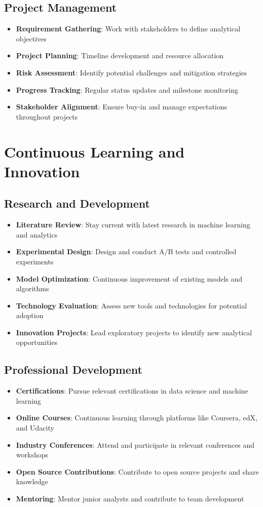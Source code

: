 \documentclass[11pt,a4paper]{article}
\begin{document}
\subsection{Project Management}
\begin{itemize}[leftmargin=*]
    \item \textbf{Requirement Gathering}: Work with stakeholders to define analytical objectives
    \item \textbf{Project Planning}: Timeline development and resource allocation
    \item \textbf{Risk Assessment}: Identify potential challenges and mitigation strategies
    \item \textbf{Progress Tracking}: Regular status updates and milestone monitoring
    \item \textbf{Stakeholder Alignment}: Ensure buy-in and manage expectations throughout projects
\end{itemize}

\section{Continuous Learning and Innovation}

\subsection{Research and Development}
\begin{itemize}[leftmargin=*]
    \item \textbf{Literature Review}: Stay current with latest research in machine learning and analytics
    \item \textbf{Experimental Design}: Design and conduct A/B tests and controlled experiments
    \item \textbf{Model Optimization}: Continuous improvement of existing models and algorithms
    \item \textbf{Technology Evaluation}: Assess new tools and technologies for potential adoption
    \item \textbf{Innovation Projects}: Lead exploratory projects to identify new analytical opportunities
\end{itemize}

\subsection{Professional Development}
\begin{itemize}[leftmargin=*]
    \item \textbf{Certifications}: Pursue relevant certifications in data science and machine learning
    \item \textbf{Online Courses}: Continuous learning through platforms like Coursera, edX, and Udacity
    \item \textbf{Industry Conferences}: Attend and participate in relevant conferences and workshops
    \item \textbf{Open Source Contributions}: Contribute to open source projects and share knowledge
    \item \textbf{Mentoring}: Mentor junior analysts and contribute to team development
\end{itemize}
\end{document}
